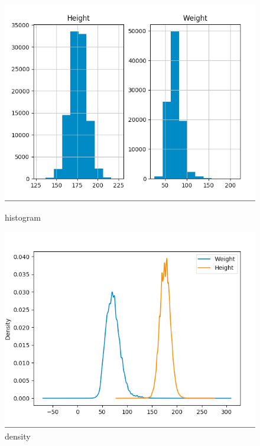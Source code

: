 \documentclass{42-en}
\begin{document}
\begin{figure}[h!]
  \begin{minipage}[l]{0.49\linewidth}
    \includegraphics[scale=0.39]{assets/ex06_histogram.png}
    \caption{histogram}
  \end{minipage}
  \hfill
  \begin{minipage}[c]{0.49\linewidth}
    \includegraphics[scale=0.39]{assets/ex06_density.png}
    \caption{density}
  \end{minipage}
  

\end{figure}
\end{document}
